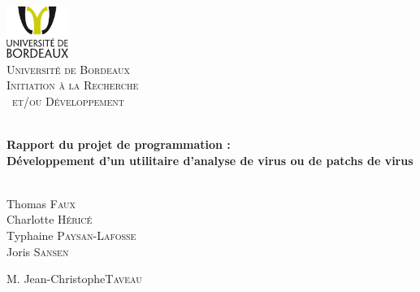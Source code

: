 %

\begin{titlepage}

\begin{center}


\includegraphics[width=0.15\textwidth]{logounibdx.png}\\[1cm]

\textsc{\LARGE Université de Bordeaux}\\[1.5cm]
\vspace*{0.5cm}
\textsc{\Large Initiation à la Recherche\\\ et/ou Développement}\\[0.5cm]

\vspace*{1cm}

\HRule \\[0.3cm]
{ \huge \bfseries Rapport du projet de programmation : \\ Développement d'un utilitaire d'analyse de virus ou de patchs de virus}\\[0.3cm]

\HRule \\[1.5cm]
\begin{minipage}{0.4\textwidth}
\begin{center} \large
Thomas \textsc{Faux}\\
Charlotte \textsc{Héricé}\\
Typhaine \textsc{Paysan-Lafosse}\\
Joris \textsc{Sansen}\\
\end{center}
\end{minipage}
\begin{minipage}{0.4\textwidth}
\begin{flushright} \large
M. Jean-Christophe\textsc{Taveau}
\end{flushright}
\end{minipage}


\end{center}
\end{titlepage}
